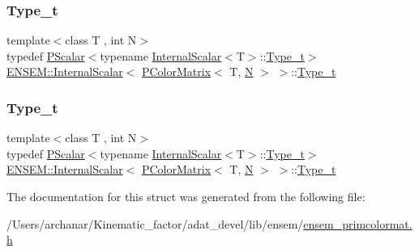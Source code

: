 \subsubsection{\texorpdfstring{Type\_t}{Type\_t}\hspace{0.1cm}{\footnotesize\ttfamily [1/2]}}
{\footnotesize\ttfamily template$<$class T , int N$>$ \\
typedef \mbox{\hyperlink{classENSEM_1_1PScalar}{P\+Scalar}}$<$typename \mbox{\hyperlink{structENSEM_1_1InternalScalar}{Internal\+Scalar}}$<$T$>$\+::\mbox{\hyperlink{structENSEM_1_1InternalScalar_3_01PColorMatrix_3_01T_00_01N_01_4_01_4_a9b1738a10ca607ed8d2cee3b7e88d1b1}{Type\+\_\+t}}$>$ \mbox{\hyperlink{structENSEM_1_1InternalScalar}{E\+N\+S\+E\+M\+::\+Internal\+Scalar}}$<$ \mbox{\hyperlink{classENSEM_1_1PColorMatrix}{P\+Color\+Matrix}}$<$ T, \mbox{\hyperlink{operator__name__util_8cc_a7722c8ecbb62d99aee7ce68b1752f337}{N}} $>$ $>$\+::\mbox{\hyperlink{structENSEM_1_1InternalScalar_3_01PColorMatrix_3_01T_00_01N_01_4_01_4_a9b1738a10ca607ed8d2cee3b7e88d1b1}{Type\+\_\+t}}}

\mbox{\label{structENSEM_1_1InternalScalar_3_01PColorMatrix_3_01T_00_01N_01_4_01_4_a9b1738a10ca607ed8d2cee3b7e88d1b1}} 
\subsubsection{\texorpdfstring{Type\_t}{Type\_t}\hspace{0.1cm}{\footnotesize\ttfamily [2/2]}}
{\footnotesize\ttfamily template$<$class T , int N$>$ \\
typedef \mbox{\hyperlink{classENSEM_1_1PScalar}{P\+Scalar}}$<$typename \mbox{\hyperlink{structENSEM_1_1InternalScalar}{Internal\+Scalar}}$<$T$>$\+::\mbox{\hyperlink{structENSEM_1_1InternalScalar_3_01PColorMatrix_3_01T_00_01N_01_4_01_4_a9b1738a10ca607ed8d2cee3b7e88d1b1}{Type\+\_\+t}}$>$ \mbox{\hyperlink{structENSEM_1_1InternalScalar}{E\+N\+S\+E\+M\+::\+Internal\+Scalar}}$<$ \mbox{\hyperlink{classENSEM_1_1PColorMatrix}{P\+Color\+Matrix}}$<$ T, \mbox{\hyperlink{operator__name__util_8cc_a7722c8ecbb62d99aee7ce68b1752f337}{N}} $>$ $>$\+::\mbox{\hyperlink{structENSEM_1_1InternalScalar_3_01PColorMatrix_3_01T_00_01N_01_4_01_4_a9b1738a10ca607ed8d2cee3b7e88d1b1}{Type\+\_\+t}}}



The documentation for this struct was generated from the following file\+:\begin{DoxyCompactItemize}
\item 
/\+Users/archanar/\+Kinematic\+\_\+factor/adat\+\_\+devel/lib/ensem/\mbox{\hyperlink{lib_2ensem_2ensem__primcolormat_8h}{ensem\+\_\+primcolormat.\+h}}\end{DoxyCompactItemize}
